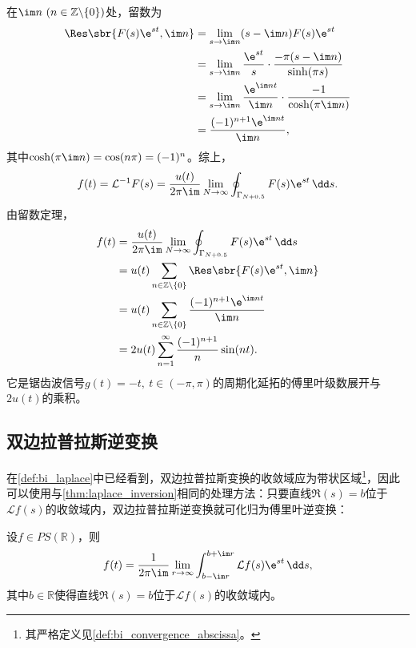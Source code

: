 \begin{example}
    在$\im n\ (n\in\mathbb{Z}\backslash\{0\})$处，留数为
    \begin{align}
        \Res\sbr{F(s)\e^{st},\im n}
        &=\lim_{s\to\im n}(s-\im n)F(s)\e^{st}\nonumber\\
        &=\lim_{s\to\im n}\frac{\e^{st}}{s}\cdot\frac{-\pi(s-\im n)}{\sinh(\pi s)}\nonumber\\
        &=\lim_{s\to\im n}\frac{\e^{\im nt}}{\im n}\cdot\frac{-1}{\cosh(\pi\im n)}\nonumber\\
        &=\frac{(-1)^{n+1}\e^{\im nt}}{\im n},
    \end{align}
    其中$\cosh(\pi\im n)=\cos(n\pi)=(-1)^n$。综上，
    \begin{equation}
        f(t)=\mathcal{L}^{-1}F(s)=\frac{u(t)}{2\pi\im}\lim_{N\to\infty}\oint_{\Gamma_{N+0.5}}F(s)\e^{st}\,\dd s.
    \end{equation}
    由留数定理，
    \begin{align}
        f(t)&=\frac{u(t)}{2\pi\im}\lim_{N\to\infty}\oint_{\Gamma_{N+0.5}}F(s)\e^{st}\,\dd s\nonumber\\
        &=u(t)\sum_{n\in\mathbb{Z}\backslash\{0\}}\Res\sbr{F(s)\e^{st},\im n}\nonumber\\
        &=u(t)\sum_{n\in\mathbb{Z}\backslash\{0\}}\frac{(-1)^{n+1}\e^{\im nt}}{\im n}\nonumber\\
        &=2u(t)\sum_{n=1}^{\infty}\frac{(-1)^{n+1}}{n}\sin(nt).
    \end{align}
    它是锯齿波信号$g(t)=-t,\ t\in(-\pi,\pi)$的周期化延拓的傅里叶级数展开与$2u(t)$的乘积。
\end{example}

\subsection{双边拉普拉斯逆变换}\label{sub:bi_laplace_inv}

在\cref{def:bi_laplace}中已经看到，双边拉普拉斯变换的收敛域应为带状区域\footnote{其严格定义见\cref{def:bi_convergence_abscissa}。}，因此可以使用与\cref{thm:laplace_inversion}相同的处理方法：只要直线$\Re(s)=b$位于$\mathcal{L}f(s)$的收敛域内，双边拉普拉斯逆变换就可化归为傅里叶逆变换：
\begin{theorem}[双边拉普拉斯逆变换]\label{thm:bi_laplace_inv}
    设$f\in PS(\mathbb{R})$，则
    \begin{equation}
        f(t)=\frac{1}{2\pi\im}\lim_{r\to\infty}\int_{b-\im r}^{b+\im r}\mathcal{L}f(s)\e^{st}\,\dd s,
    \end{equation}
    其中$b\in\mathbb{R}$使得直线$\Re(s)=b$位于$\mathcal{L}f(s)$的收敛域内。
\end{theorem}

